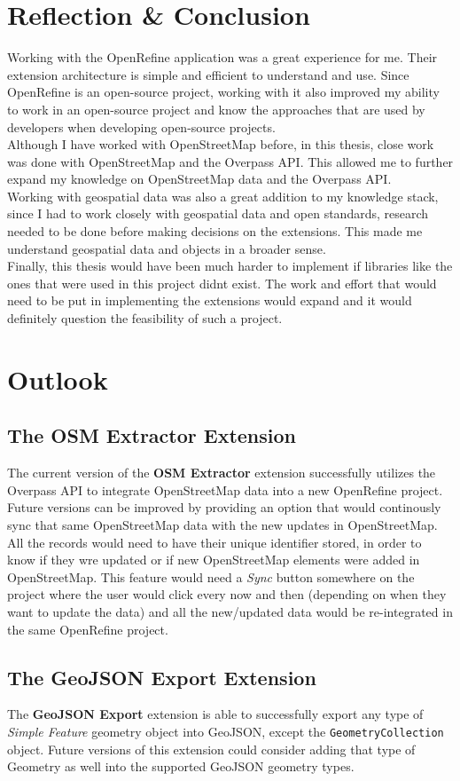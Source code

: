 \section{Reflection \& Conclusion}
Working with the OpenRefine application was a great experience for me. Their extension architecture is simple and efficient to understand and use.
Since OpenRefine is an open-source project, working with it also improved my ability to work in an open-source project
and know the approaches that are used by developers when developing open-source projects.\\
\newline
Although I have worked with OpenStreetMap before, in this thesis, close work was done with OpenStreetMap and the Overpass API. This allowed me to further
expand my knowledge on OpenStreetMap data and the Overpass API.\\
\newline
Working with geospatial data was also a great addition to my knowledge stack, since I had to work closely with geospatial data and open standards,
research needed to be done before making decisions on the extensions. This made me understand geospatial data and objects in a broader sense.\\
\newline
Finally, this thesis would have been much harder to implement if libraries like the ones that were used in this project didn\textquotesingle t exist. The work and effort
that would need to be put in implementing the extensions would expand and it would definitely question the feasibility of such a project.
\section{Outlook}
\subsection{The OSM Extractor Extension}
The current version of the \textbf{OSM Extractor} extension successfully utilizes the Overpass API to integrate OpenStreetMap
data into a new OpenRefine project. Future versions can be improved by providing an option that would continously sync that same OpenStreetMap data
with the new updates in OpenStreetMap. All the records would need to have their unique identifier stored, in order to know if they wre updated or if new
OpenStreetMap elements were added in OpenStreetMap. This feature would need a \textit{Sync} button somewhere on the project
where the user would click every now and then (depending on when they want to update the data) and all the new/updated data would be re-integrated in the same OpenRefine project.
\subsection{The GeoJSON Export Extension}
The \textbf{GeoJSON Export} extension is able to successfully export any type of \textit{Simple Feature} geometry object into GeoJSON, except the \texttt{GeometryCollection} object.
Future versions of this extension could consider adding that type of Geometry as well into the supported GeoJSON geometry types.